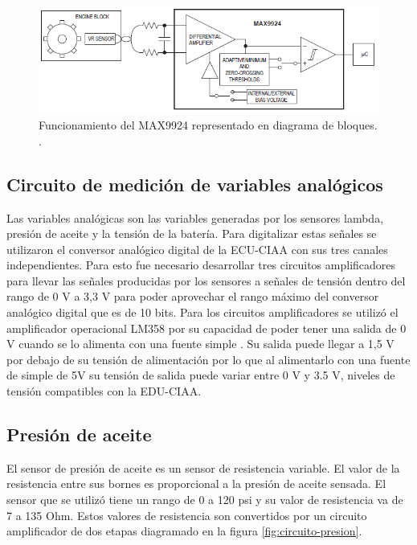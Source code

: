 \break

\begin{figure}[htpb]
\centering
\includegraphics[width=.9\textwidth]{./Figures/max9924.png}
\caption{Funcionamiento del MAX9924 representado en diagrama de bloques. \protect\footnotemark[3].}
\label{fig:bloq-rpm}
\end{figure}


\subsection{Circuito de medición de variables analógicos}

Las variables analógicas son las variables generadas por los sensores lambda, presión de aceite y la tensión de la batería. Para digitalizar estas señales se utilizaron el conversor analógico digital de la ECU-CIAA con sus tres canales independientes. Para esto fue necesario desarrollar tres circuitos amplificadores para llevar las señales producidas por los sensores a señales de tensión dentro del rango de 0 V a 3,3 V para poder aprovechar el rango máximo del conversor analógico digital que es de 10 bits. Para los circuitos amplificadores se utilizó el amplificador operacional LM358 por su capacidad de poder tener una salida de 0 V cuando se lo alimenta con una fuente simple \cite{lm358}. Su salida puede llegar a 1,5 V por debajo de su tensión de alimentación por lo que al alimentarlo con una fuente de simple de 5V su tensión de salida puede variar entre 0 V y 3.5 V, niveles de tensión compatibles con la EDU-CIAA.

\subsection{Presión de aceite}

El sensor de presión de aceite es un sensor de resistencia variable. El valor de la resistencia entre sus bornes es proporcional a la presión de aceite sensada. El sensor que se utilizó tiene un rango de 0 a 120 psi y su valor de resistencia va de 7 a 135 Ohm. Estos valores de resistencia son convertidos por un circuito amplificador de dos etapas diagramado en la figura \ref{fig:circuito-presion}.

